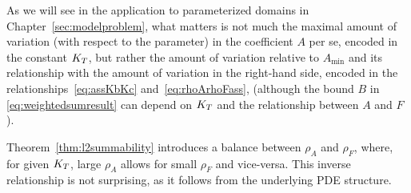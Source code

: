 \begin{remark}\label{rem:seperation1}
As we will see in the application to parameterized domains in Chapter~\ref{sec:modelproblem}, what matters is not much the maximal amount of variation (with respect to the parameter) in the coefficient $A$ per se, encoded in the constant $K_T$, but rather the amount of variation relative to $A_{\min}$ and its relationship with the amount of variation in the right-hand side, encoded in the relationships~\eqref{eq:assKbKc} and~\eqref{eq:rhoArhoFass},  (although the bound $B$ in \eqref{eq:weightedsumresult} can depend on $K_T$ and the relationship between $A$ and $F$).
\end{remark}
\begin{remark}
	Theorem~\ref{thm:l2summability} introduces a balance between $\rho_A$ and $\rho_F$, where, for given $K_T$, large $\rho_A$ allows for small $\rho_F$ and vice-versa.
	This inverse relationship is not surprising, as it follows from the underlying PDE structure.
\end{remark}





